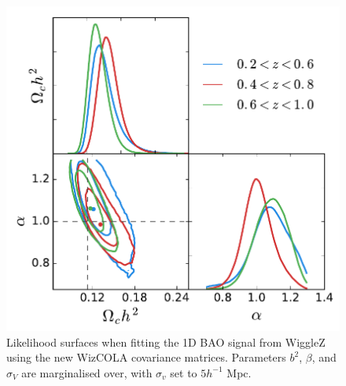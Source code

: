\documentclass[iop,twocolappendix]{emulateapj}
\begin{document}
\begin{figure}
	\begin{center}
		\includegraphics[width=\columnwidth]{images/fMonpole.pdf}
	\end{center}
	\caption{Likelihood surfaces when fitting the 1D BAO signal from WiggleZ using the new WizCOLA covariance matrices. Parameters $b^2$, $\beta$, and $\sigma_V$ are marginalised over, with $\sigma_v$ set to $5 h^{-1}$ Mpc.}
	\label{fig:fmonopole}
\end{figure}
\end{document}
